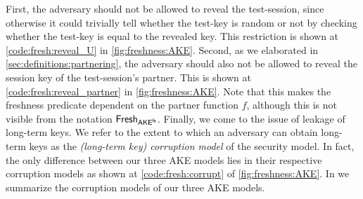 First,
the adversary should not be allowed to reveal the test-session,
since otherwise it could trivially tell whether the test-key is random or not by checking whether the test-key is equal to the revealed key.
This restriction is shown at \cref{code:fresh:reveal_U} in \cref{fig:freshness:AKE}.
Second,
as we elaborated in \cref{sec:definitions:partnering},
the adversary should also not be allowed to reveal the session key of the test-session's partner.
This is shown at \cref{code:fresh:reveal_partner} in \cref{fig:freshness:AKE}.
Note that this makes the freshness predicate dependent on the partner function $f$,
although this is not visible from the notation $\mathsf{Fresh}_{\mathsf{AKE}^{\mathsf{fs}}}$.
Finally,
we come to the issue of leakage of long-term keys.
We refer to the extent to which an adversary can obtain long-term keys as the \emph{(long-term key) corruption model} of the security model.
In fact,
the only difference between our three AKE models lies in their respective corruption models as shown at \cref{code:fresh:corrupt} of \cref{fig:freshness:AKE}.
In  we summarize the corruption models of our three AKE models. 




